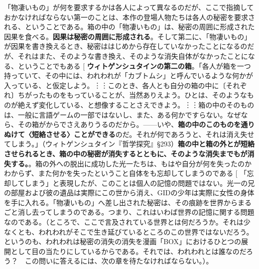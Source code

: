 \documentclass[9pt,b5j,twoside,twocolumn]{utarticle}
\makeatletter
\def\yakuchu{%
\@ifnextchar[\@xfootnote %
{\stepcounter{yakuchu}%
\protected@xdef\@thefnmark{\theyakuchu}%
\@footnotemark\@footnotetext}}
\makeatother
\begin{document}
「物凄いもの」が何を要求するかは各人によって異なるのだが、ここで指摘しておかなければならない第一のことは、本作の登場人物たちは各人の秘密を要求される、ということである。箱の中の「物凄いもの」は、秘密の周囲に形成された因果を食べる。\textbf{因果は秘密の周囲に形成される}。そして第二に、「物凄いもの」が因果を書き換えるとき、秘密ははじめから存在していなかったことになるのだが、それはまた、そのような書き換え、そのような消失自体がなかったことになる、ということでもある\yakuchu{\textbf{ウィトゲンシュタインの第二の箱}。「各人が箱を一つ持っていて、その中には、われわれが「カブトムシ」と呼んでいるような何かが入っている、と仮定しよう。︙︙このとき、各人とも自分の箱の中に〔それぞれ〕ちがったものをもっていることが、当然ありえよう。ひとは、そのようなものが絶えず変化している、と想像することさえできよう。︙︙箱の中のそのものは、一般に言語ゲームの一部ではないし、また、ある何かですらない。なぜなら、その箱がからでさえありうるのだから。------いや、\textbf{箱の中のこのものを通りぬけて〈短絡させる〉ことができる}のだ。それが何であろうと、それは消え失せてしまう。」（ウィトゲンシュタイン『哲学探究』§293）\textbf{箱の中と箱の外とが短絡させられるとき、箱の中の秘密が消失するとともに、そのような消失までもが消失する。}}。箱の外への脱出に成功した光一たちは、もはや自分が何を失ったのかわからず、また何かを失ったということ自体をも忘却してしまうのである\yakuchu{「忘却してしまう」と表現したが、このことは個人の記憶の問題ではない。光一の兄の部屋および彼の遺品は実際にこの世から消え、GIDの少年は実際に女性の身体を手に入れる。「物凄いもの」へ差し出された秘密は、その痕跡を世界からまるごと消し去ってしまうのである。つまり、これはいわば世界の記憶に関する問題なのである。（ところで、ここで言及されている世界とは何だろうか。それは少なくとも、われわれがそこで生き延びているところのこの世界ではないだろう。というのも、われわれは秘密の消失の消失を漫画「BOX」におけるひとつの展開として目の当たりにしているからである。それでは、われわれとは誰なのだろう？　この問いに答えるには、次の章を待たなければならない。）}。
\end{document}
